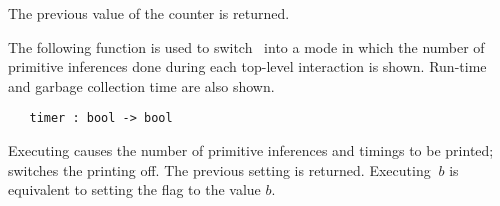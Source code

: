 \noindent The previous value of the counter is returned.

The following function is used to switch \ML\ into a  mode in  which the number
of primitive inferences done during each top-level interaction is  shown.
Run-time and garbage collection time are also shown.

\begin{boxed}
\begin{verbatim}
   timer : bool -> bool
\end{verbatim}\end{boxed}

\noindent Executing  causes  the number  of primitive inferences
and timings to be  printed;  switches  the printing  off.  The
previous setting  is
returned.    Executing  $\ b$  is equivalent to
setting the flag  to the value $b$.

